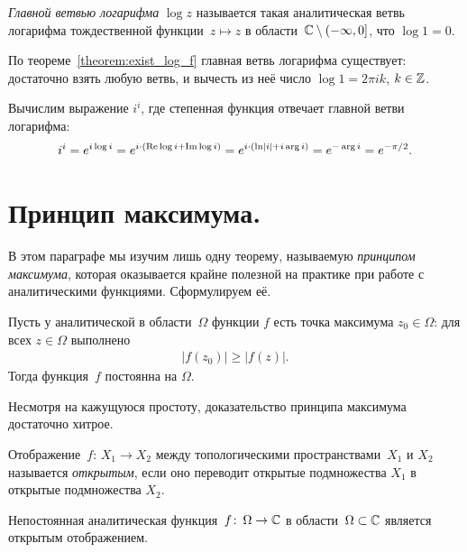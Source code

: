 \documentclass[../complex-analysis.tex]{subfiles}
\begin{document}
\begin{df}
 \textit{Главной ветвью логарифма} $ \log z $ называется такая аналитическая ветвь логарифма тождественной функции~$ z \mapsto z $ в области~$ \mathbb{C} \setminus (-\infty, 0] $, что $ \log 1 = 0 $.
\end{df}

По теореме~\ref{theorem:exist_log_f} главная ветвь логарифма существует: достаточно взять любую ветвь, и вычесть из неё число $ \log 1 = 2\pi i k $, $ k \in \mathbb{Z} $.

\begin{exmpl}
 Вычислим выражение $ i^{i} $, где степенная функция отвечает главной ветви логарифма:
 \begin{align*}
  i^{i} = e^{i \log i} = e^{i \cdot \left( \operatorname{Re} \log i + \operatorname{Im} \log i \right)} = e^{i \cdot \left( \ln \left| i \right| + i \arg i \right)} = e^{-\arg i} = e^{-\pi / 2}.
 \end{align*}
\end{exmpl}

\newpage
\section{Принцип максимума.}

В этом параграфе мы изучим лишь одну теорему, называемую \emph{принципом максимума}, которая оказывается крайне полезной на практике при работе с аналитическими функциями. Сформулируем её.

\begin{thm}
 \label{theorem:maximum_principle}
 Пусть у аналитической в области~$ \Omega $ функции $f$ есть точка максимума $ z_0 \in \Omega $: для всех $ z\in\Omega $ выполнено
 \begin{align*}
  \left| f(z_0) \right| \geqslant \left| f(z) \right|.
 \end{align*} Тогда функция~$ f $ постоянна на $ \Omega $.
\end{thm}

Несмотря на кажущуюся простоту, доказательство принципа максимума достаточно хитрое.

\begin{df}
 Отображение~$ f\colon\,X_1 \to X_2 $ между топологическими пространствами~$ X_1 $ и $ X_2 $ называется \emph{открытым}, если оно переводит открытые подмножества $ X_1 $ в открытые подмножества $ X_2 $.
\end{df}

\begin{thm}
 \label{theorem:analytic_implies_open}
 Непостоянная аналитическая функция~$ f\colon\,\Omega\to\mathbb{C} $ в области~$ \Omega \subset \mathbb{C} $ является открытым отображением.
\end{thm}
\end{document}
